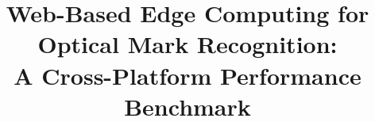 \documentclass[conference]{IEEEtran}
\begin{document}
\title{Web-Based Edge Computing for Optical Mark Recognition:\\
A Cross-Platform Performance Benchmark}

\author{%
\and
{}
\and
{}
}

\maketitle

\begin{abstract}

\end{abstract}
\end{document}
